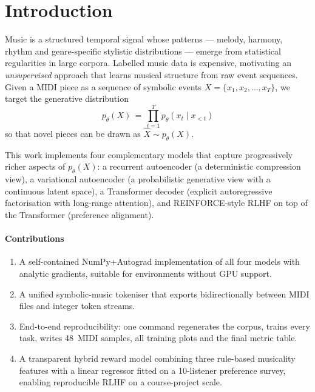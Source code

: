 \documentclass[conference]{IEEEtran}
\begin{document}
\section{Introduction}

Music is a structured temporal signal whose patterns --- melody, harmony,
rhythm and genre-specific stylistic distributions --- emerge from statistical
regularities in large corpora. Labelled music data is expensive, motivating
an \emph{unsupervised} approach that learns musical structure from raw
event sequences. Given a MIDI piece as a sequence of symbolic events
$X = \{x_1, x_2, \dots, x_T\}$, we target the generative distribution
\begin{equation}
p_\theta(X) \,=\, \prod_{t=1}^{T} p_\theta(x_t \mid x_{<t})
\label{eq:ar}
\end{equation}
so that novel pieces can be drawn as $\hat{X} \sim p_\theta(X)$.

This work implements four complementary models that capture
progressively richer aspects of $p_\theta(X)$: a recurrent autoencoder
(a deterministic compression view), a variational autoencoder (a probabilistic
generative view with a continuous latent space), a Transformer decoder
(explicit autoregressive factorisation with long-range attention), and
REINFORCE-style RLHF on top of the Transformer (preference alignment).

\paragraph*{Contributions}
\begin{enumerate}
  \item A self-contained NumPy+Autograd implementation of all four models
        with analytic gradients, suitable for environments without GPU
        support.
  \item A unified symbolic-music tokeniser that exports bidirectionally
        between MIDI files and integer token streams.
  \item End-to-end reproducibility: one command regenerates the corpus,
        trains every task, writes 48~MIDI samples, all training plots and
        the final metric table.
  \item A transparent hybrid reward model combining three rule-based
        musicality features with a linear regressor fitted on a
        10-listener preference survey, enabling reproducible RLHF on a
        course-project scale.
\end{enumerate}
\end{document}
